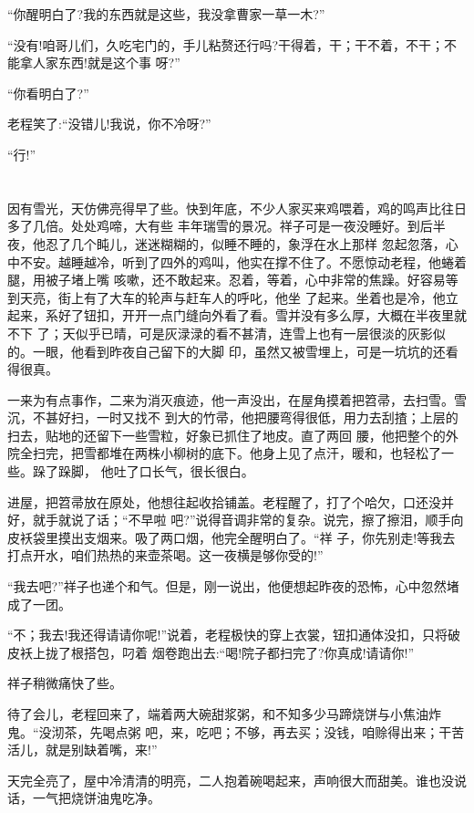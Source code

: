 \documentclass[11pt,a4paper,onecolumn]{article}
\begin{document}
``你醒明白了?我的东西就是这些，我没拿曹家一草一木?''

``没有!咱哥儿们，久吃宅门的，手儿粘赘还行吗?干得着，干；干不着，不干；不能拿人家东西!就是这个事
呀?''

``你看明白了?''

老程笑了:``没错儿!我说，你不冷呀?''

``行!''

\pagebreak
\section{}

因有雪光，天仿佛亮得早了些。快到年底，不少人家买来鸡喂着，鸡的鸣声比往日多了几倍。处处鸡啼，大有些
丰年瑞雪的景况。祥子可是一夜没睡好。到后半夜，他忍了几个盹儿，迷迷糊糊的，似睡不睡的，象浮在水上那样
忽起忽落，心中不安。越睡越冷，听到了四外的鸡叫，他实在撑不住了。不愿惊动老程，他蜷着腿，用被子堵上嘴
咳嗽，还不敢起来。忍着，等着，心中非常的焦躁。好容易等到天亮，街上有了大车的轮声与赶车人的呼叱，他坐
了起来。坐着也是冷，他立起来，系好了钮扣，开开一点门缝向外看了看。雪并没有多么厚，大概在半夜里就不下
了；天似乎已晴，可是灰渌渌的看不甚清，连雪上也有一层很淡的灰影似的。一眼，他看到昨夜自己留下的大脚
印，虽然又被雪埋上，可是一坑坑的还看得很真。

一来为有点事作，二来为消灭痕迹，他一声没出，在屋角摸着把笤帚，去扫雪。雪沉，不甚好扫，一时又找不
到大的竹帚，他把腰弯得很低，用力去刮揸；上层的扫去，贴地的还留下一些雪粒，好象已抓住了地皮。直了两回
腰，他把整个的外院全扫完，把雪都堆在两株小柳树的底下。他身上见了点汗，暖和，也轻松了一些。跺了跺脚，
他吐了口长气，很长很白。

进屋，把笤帚放在原处，他想往起收拾铺盖。老程醒了，打了个哈欠，口还没并好，就手就说了话；``不早啦
吧?''说得音调非常的复杂。说完，擦了擦泪，顺手向皮袄袋里摸出支烟来。吸了两口烟，他完全醒明白了。``祥
子，你先别走!等我去打点开水，咱们热热的来壶茶喝。这一夜横是够你受的!''

``我去吧?''祥子也递个和气。但是，刚一说出，他便想起昨夜的恐怖，心中忽然堵成了一团。

``不；我去!我还得请请你呢!''说着，老程极快的穿上衣裳，钮扣通体没扣，只将破皮袄上拢了根搭包，叼着
烟卷跑出去:``喝!院子都扫完了?你真成!请请你!''

祥子稍微痛快了些。

待了会儿，老程回来了，端着两大碗甜浆粥，和不知多少马蹄烧饼与小焦油炸鬼。``没沏茶，先喝点粥
吧，来，吃吧；不够，再去买；没钱，咱赊得出来；干苦活儿，就是别缺着嘴，来!''

天完全亮了，屋中冷清清的明亮，二人抱着碗喝起来，声响很大而甜美。谁也没说话，一气把烧饼油鬼吃净。
\end{document}
